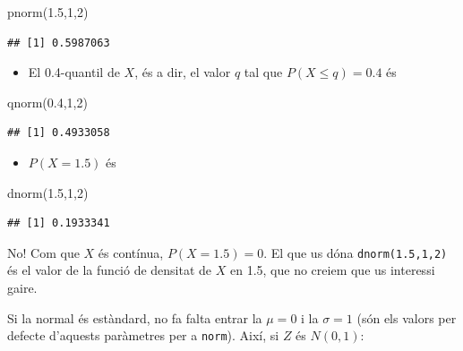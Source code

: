 \documentclass[
]{book}
\newenvironment{Shaded}{\begin{snugshade}}{\end{snugshade}}
\newcommand{\DecValTok}[1]{\textcolor[rgb]{0.00,0.00,0.81}{#1}}
\newcommand{\FloatTok}[1]{\textcolor[rgb]{0.00,0.00,0.81}{#1}}
\newcommand{\FunctionTok}[1]{\textcolor[rgb]{0.00,0.00,0.00}{#1}}
\newcommand{\NormalTok}[1]{#1}
\providecommand{\tightlist}{%
  \setlength{\itemsep}{0pt}\setlength{\parskip}{0pt}}
\renewcommand{\leq}{\leqslant}
\theoremstyle{definition}
\theoremstyle{definition}
\theoremstyle{definition}
\theoremstyle{remark}
\begin{document}
\begin{Shaded}
\begin{Highlighting}[]
\FunctionTok{pnorm}\NormalTok{(}\FloatTok{1.5}\NormalTok{,}\DecValTok{1}\NormalTok{,}\DecValTok{2}\NormalTok{)}
\end{Highlighting}
\end{Shaded}

\begin{verbatim}
## [1] 0.5987063
\end{verbatim}

\begin{itemize}
\tightlist
\item
  El 0.4-quantil de \(X\), és a dir, el valor \(q\) tal que \(P(X\leq q)=0.4\) és
\end{itemize}

\begin{Shaded}
\begin{Highlighting}[]
\FunctionTok{qnorm}\NormalTok{(}\FloatTok{0.4}\NormalTok{,}\DecValTok{1}\NormalTok{,}\DecValTok{2}\NormalTok{)}
\end{Highlighting}
\end{Shaded}

\begin{verbatim}
## [1] 0.4933058
\end{verbatim}

\begin{itemize}
\tightlist
\item
  \(P(X=1.5)\) és
\end{itemize}

\begin{Shaded}
\begin{Highlighting}[]
\FunctionTok{dnorm}\NormalTok{(}\FloatTok{1.5}\NormalTok{,}\DecValTok{1}\NormalTok{,}\DecValTok{2}\NormalTok{)}
\end{Highlighting}
\end{Shaded}

\begin{verbatim}
## [1] 0.1933341
\end{verbatim}

\begin{rmderror}
No! Com que \(X\) és contínua, \(P(X=1.5)=0\). El que us dóna \texttt{dnorm(1.5,1,2)} és el valor de la funció de densitat de \(X\) en 1.5, que no creiem que us interessi gaire.
\end{rmderror}

Si la normal és estàndard, no fa falta entrar la \(\mu=0\) i la \(\sigma=1\) (són els valors per defecte d'aquests paràmetres per a \texttt{norm}). Així, si \(Z\) és \(N(0,1)\):
\end{document}

